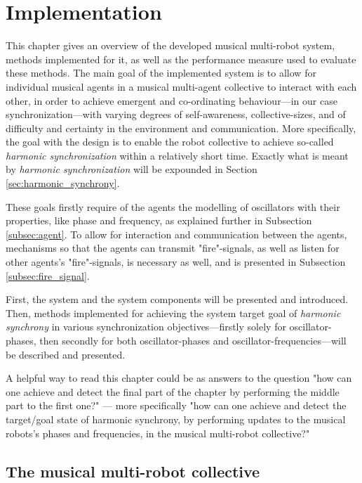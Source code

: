 \chapter{Implementation}
This chapter gives an overview of the developed musical multi-robot system, methods implemented for it, as well as the performance measure used to evaluate these methods. The main goal of the implemented system is to allow for individual musical agents in a musical multi-agent collective to interact with each other, in order to achieve emergent and co-ordinating behaviour—in our case synchronization—with varying degrees of self-awareness, collective-sizes, and of difficulty and certainty in the environment and communication. More specifically, the goal with the design is to enable the robot collective to achieve so-called \textit{harmonic synchronization} within a relatively short time. Exactly what is meant by \textit{harmonic synchronization} will be expounded in Section \ref{sec:harmonic_synchrony}.

These goals firstly require of the agents the modelling of oscillators with their properties, like phase and frequency, as explained further in Subsection \ref{subsec:agent}. To allow for interaction and communication between the agents, mechanisms so that the agents can transmit "fire"-signals, as well as listen for other agents's "fire"-signals, is necessary as well, and is presented in Subsection \ref{subsec:fire_signal}.

First, the system and the system components will be presented and introduced. Then, methods implemented for achieving the system target goal of \textit{harmonic synchrony} in various synchronization objectives—firstly solely for oscillator-phases, then secondly for both oscillator-phases and oscillator-frequencies—will be described and presented.

A helpful way to read this chapter could be as answers to the question "how can one achieve and detect the final part of the chapter by performing the middle part to the first one?" — more specifically "how can one achieve and detect the target/goal state of harmonic synchrony, by performing updates to the musical robots's phases and frequencies, in the musical multi-robot collective?"




\section{The musical multi-robot collective}
\label{sec:developed_system}

